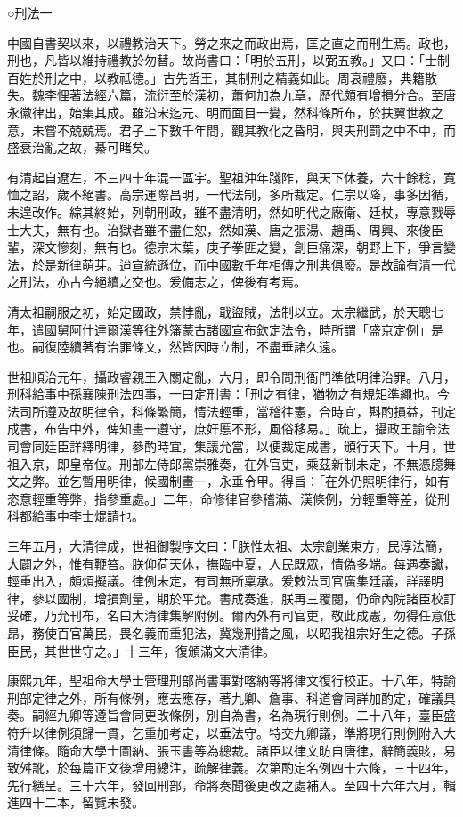 
\begin{pinyinscope}
○刑法一

中國自書契以來，以禮教治天下。勞之來之而政出焉，匡之直之而刑生焉。政也，刑也，凡皆以維持禮教於勿替。故尚書曰：「明於五刑，以弼五教。」又曰：「士制百姓於刑之中，以教祗德。」古先哲王，其制刑之精義如此。周衰禮廢，典籍散失。魏李悝著法經六篇，流衍至於漢初，蕭何加為九章，歷代頗有增損分合。至唐永徽律出，始集其成。雖沿宋迄元、明而面目一變，然科條所布，於扶翼世教之意，未嘗不兢兢焉。君子上下數千年間，觀其教化之昏明，與夫刑罰之中不中，而盛衰治亂之故，綦可睹矣。

有清起自遼左，不三四十年混一區宇。聖祖沖年踐阼，與天下休養，六十餘稔，寬恤之詔，歲不絕書。高宗運際昌明，一代法制，多所裁定。仁宗以降，事多因循，未遑改作。綜其終始，列朝刑政，雖不盡清明，然如明代之廠衛、廷杖，專意戮辱士大夫，無有也。治獄者雖不盡仁恕，然如漢、唐之張湯、趙禹、周興、來俊臣輩，深文慘刻，無有也。德宗末葉，庚子拳匪之變，創巨痛深，朝野上下，爭言變法，於是新律萌芽。迨宣統遜位，而中國數千年相傳之刑典俱廢。是故論有清一代之刑法，亦古今絕續之交也。爰備志之，俾後有考焉。

清太祖嗣服之初，始定國政，禁悖亂，戢盜賊，法制以立。太宗繼武，於天聰七年，遣國舅阿什達爾漢等往外籓蒙古諸國宣布欽定法令，時所謂「盛京定例」是也。嗣復陸續著有治罪條文，然皆因時立制，不盡垂諸久遠。

世祖順治元年，攝政睿親王入關定亂，六月，即令問刑衙門準依明律治罪。八月，刑科給事中孫襄陳刑法四事，一曰定刑書：「刑之有律，猶物之有規矩準繩也。今法司所遵及故明律令，科條繁簡，情法輕重，當稽往憲，合時宜，斟酌損益，刊定成書，布告中外，俾知畫一遵守，庶奸慝不形，風俗移易。」疏上，攝政王諭令法司會同廷臣詳繹明律，參酌時宜，集議允當，以便裁定成書，頒行天下。十月，世祖入京，即皇帝位。刑部左侍郎黨崇雅奏，在外官吏，乘茲新制未定，不無憑臆舞文之弊。並乞暫用明律，候國制畫一，永垂令甲。得旨：「在外仍照明律行，如有恣意輕重等弊，指參重處。」二年，命修律官參稽滿、漢條例，分輕重等差，從刑科都給事中李士焜請也。

三年五月，大清律成，世祖御製序文曰：「朕惟太祖、太宗創業東方，民淳法簡，大闢之外，惟有鞭笞。朕仰荷天休，撫臨中夏，人民既眾，情偽多端。每遇奏讞，輕重出入，頗煩擬議。律例未定，有司無所稟承。爰敕法司官廣集廷議，詳譯明律，參以國制，增損劑量，期於平允。書成奏進，朕再三覆閱，仍命內院諸臣校訂妥確，乃允刊布，名曰大清律集解附例。爾內外有司官吏，敬此成憲，勿得任意低昂，務使百官萬民，畏名義而重犯法，冀幾刑措之風，以昭我祖宗好生之德。子孫臣民，其世世守之。」十三年，復頒滿文大清律。

康熙九年，聖祖命大學士管理刑部尚書事對喀納等將律文復行校正。十八年，特諭刑部定律之外，所有條例，應去應存，著九卿、詹事、科道會同詳加酌定，確議具奏。嗣經九卿等遵旨會同更改條例，別自為書，名為現行則例。二十八年，臺臣盛符升以律例須歸一貫，乞重加考定，以垂法守。特交九卿議，準將現行則例附入大清律條。隨命大學士圖納、張玉書等為總裁。諸臣以律文昉自唐律，辭簡義賅，易致舛訛，於每篇正文後增用總注，疏解律義。次第酌定名例四十六條，三十四年，先行繕呈。三十六年，發回刑部，命將奏聞後更改之處補入。至四十六年六月，輯進四十二本，留覽未發。


\end{pinyinscope}
